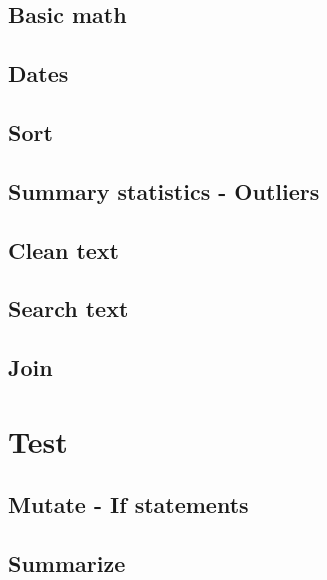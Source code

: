\documentclass[
]{book}
\begin{document}
\hypertarget{basic-math}{%
\section{Basic math}\label{basic-math}}

\hypertarget{dates}{%
\section{Dates}\label{dates}}

\hypertarget{sort}{%
\section{Sort}\label{sort}}

\hypertarget{summary-statistics---outliers}{%
\section{Summary statistics - Outliers}\label{summary-statistics---outliers}}

\hypertarget{clean-text}{%
\section{Clean text}\label{clean-text}}

\hypertarget{search-text}{%
\section{Search text}\label{search-text}}

\hypertarget{join}{%
\section{Join}\label{join}}

\hypertarget{test}{%
\chapter{Test}\label{test}}

\hypertarget{mutate---if-statements}{%
\section{Mutate - If statements}\label{mutate---if-statements}}

\hypertarget{summarize}{%
\section{Summarize}\label{summarize}}
\end{document}
